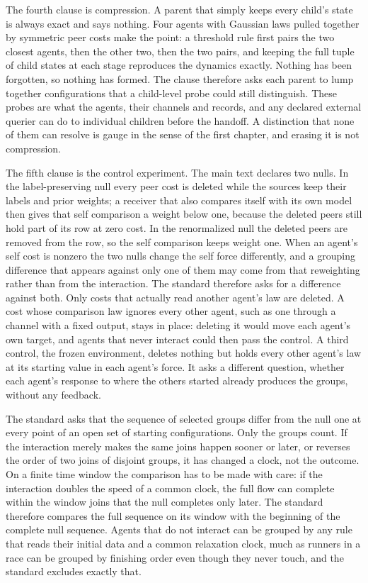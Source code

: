 The fourth clause is compression. A parent that simply keeps every child's
state is always exact and says nothing. Four agents with Gaussian laws pulled
together by symmetric peer costs make the point: a threshold rule first pairs
the two closest agents, then the other two, then the two pairs, and keeping
the full tuple of child states at each stage reproduces the dynamics exactly.
Nothing has been forgotten, so nothing has formed. The clause therefore asks
each parent to lump together configurations that a child-level probe could
still distinguish. These probes are what the agents, their channels and
records, and any declared external querier can do to individual children
before the handoff. A distinction that none of them can resolve is gauge in
the sense of the first chapter, and erasing it is not compression.

The fifth clause is the control experiment. The main text declares two
nulls. In the label-preserving null every peer cost is deleted while the
sources keep their labels and prior weights; a receiver that also compares
itself with its own model then gives that self comparison a weight below
one, because the deleted peers still hold part of its row at zero cost. In
the renormalized null the deleted peers are removed from the row, so the self
comparison keeps weight one. When an agent's self cost is nonzero the two
nulls change the self force differently, and a grouping difference that
appears against only one of them may come from that reweighting rather than
from the interaction. The standard therefore asks for a difference against
both. Only costs that actually read another agent's law are deleted. A cost
whose comparison law ignores every other agent, such as one through a
channel with a fixed output, stays in place: deleting it would move each
agent's own target, and agents that never interact could then pass the
control. A third control, the frozen environment, deletes nothing but holds
every other agent's law at its starting value in each agent's force. It asks
a different question, whether each agent's response to where the others
started already produces the groups, without any feedback.

The standard asks that the sequence of selected groups differ from the null
one at every point of an open set of starting configurations. Only the
groups count. If the interaction merely makes the same joins happen sooner
or later, or reverses the order of two joins of disjoint groups, it has
changed a clock, not the outcome. On a finite time window the comparison has
to be made with care: if the interaction doubles the speed of a common
clock, the full flow can complete within the window joins that the null
completes only later. The standard therefore compares the full sequence on
its window with the beginning of the complete null sequence. Agents that do
not interact can be grouped by any rule that reads their initial data and a
common relaxation clock, much as runners in a race can be grouped by
finishing order even though they never touch, and the standard excludes
exactly that.

